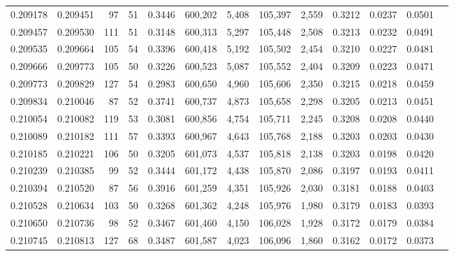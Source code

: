 \begin{tabular}{rrrrrrrrrrrrr}
0.209178 & 0.209451 &    97 &  51 &                                     0.3446 & 600,202 &   5,408 & 105,397 &   2,559 & 0.3212 & 0.0237 & 0.0501 \\
0.209457 & 0.209530 &   111 &  51 &                                     0.3148 & 600,313 &   5,297 & 105,448 &   2,508 & 0.3213 & 0.0232 & 0.0491 \\
0.209535 & 0.209664 &   105 &  54 &                                     0.3396 & 600,418 &   5,192 & 105,502 &   2,454 & 0.3210 & 0.0227 & 0.0481 \\
0.209666 & 0.209773 &   105 &  50 &                                     0.3226 & 600,523 &   5,087 & 105,552 &   2,404 & 0.3209 & 0.0223 & 0.0471 \\
0.209773 & 0.209829 &   127 &  54 &                                     0.2983 & 600,650 &   4,960 & 105,606 &   2,350 & 0.3215 & 0.0218 & 0.0459 \\
0.209834 & 0.210046 &    87 &  52 &                                     0.3741 & 600,737 &   4,873 & 105,658 &   2,298 & 0.3205 & 0.0213 & 0.0451 \\
0.210054 & 0.210082 &   119 &  53 &                                     0.3081 & 600,856 &   4,754 & 105,711 &   2,245 & 0.3208 & 0.0208 & 0.0440 \\
0.210089 & 0.210182 &   111 &  57 &                                     0.3393 & 600,967 &   4,643 & 105,768 &   2,188 & 0.3203 & 0.0203 & 0.0430 \\
0.210185 & 0.210221 &   106 &  50 &                                     0.3205 & 601,073 &   4,537 & 105,818 &   2,138 & 0.3203 & 0.0198 & 0.0420 \\
0.210239 & 0.210385 &    99 &  52 &                                     0.3444 & 601,172 &   4,438 & 105,870 &   2,086 & 0.3197 & 0.0193 & 0.0411 \\
0.210394 & 0.210520 &    87 &  56 &                                     0.3916 & 601,259 &   4,351 & 105,926 &   2,030 & 0.3181 & 0.0188 & 0.0403 \\
0.210528 & 0.210634 &   103 &  50 &                                     0.3268 & 601,362 &   4,248 & 105,976 &   1,980 & 0.3179 & 0.0183 & 0.0393 \\
0.210650 & 0.210736 &    98 &  52 &                                     0.3467 & 601,460 &   4,150 & 106,028 &   1,928 & 0.3172 & 0.0179 & 0.0384 \\
0.210745 & 0.210813 &   127 &  68 &                                     0.3487 & 601,587 &   4,023 & 106,096 &   1,860 & 0.3162 & 0.0172 & 0.0373 \\

\end{tabular}
